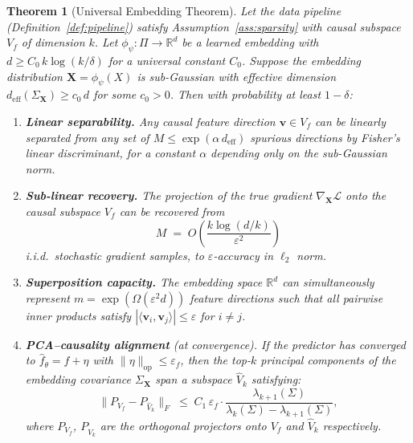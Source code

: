 \documentclass[11pt,a4paper]{article}
\theoremstyle{plain}
\newtheorem{theorem}{Theorem}[section]
\theoremstyle{definition}
\theoremstyle{remark}
\newcommand{\R}{\mathbb{R}}
\newcommand{\cL}{\mathcal{L}}
\newcommand{\deff}{d_{\mathrm{eff}}}
\newcommand{\ip}[2]{\langle #1, #2 \rangle}
\newcommand{\norm}[1]{\| #1 \|}
\begin{document}
\begin{theorem}[Universal Embedding Theorem]\label{thm:main}
Let the data pipeline (Definition~\ref{def:pipeline}) satisfy
Assumption~\ref{ass:sparsity} with causal subspace $V_f$ of dimension $k$.  Let
$\phi_\psi : \Pi \to \R^d$ be a learned embedding with $d \geq C_0\, k\log(k/\delta)$
for a universal constant $C_0$.  Suppose the embedding distribution
$\mathbf{X} = \phi_\psi(X)$ is sub-Gaussian with effective dimension
$\deff(\Sigma_{\mathbf{X}}) \geq c_0\,d$ for some $c_0 > 0$.  Then with
probability at least $1-\delta$:

\begin{enumerate}[label=\textup{(\roman*)},leftmargin=2.5em,itemsep=4pt]
  \item \textbf{Linear separability.}
    Any causal feature direction $\mathbf{v} \in V_f$ can be linearly separated
    from any set of $M \leq \exp(\alpha\,\deff)$ spurious directions by
    Fisher's linear discriminant, for a constant $\alpha$ depending only on the
    sub-Gaussian norm.

  \item \textbf{Sub-linear recovery.}
    The projection of the true gradient $\nabla_{\mathbf{X}}\cL$ onto the causal
    subspace $V_f$ can be recovered from
    \begin{equation}\label{eq:sublinear}
      M \;=\; O\!\left(\frac{k\log(d/k)}{\varepsilon^2}\right)
    \end{equation}
    i.i.d.\ stochastic gradient samples, to $\varepsilon$-accuracy in $\ell_2$
    norm.

  \item \textbf{Superposition capacity.}
    The embedding space $\R^d$ can simultaneously represent
    $m = \exp(\Omega(\varepsilon^2 d))$ feature directions such that all pairwise
    inner products satisfy $|\ip{\mathbf{v}_i}{\mathbf{v}_j}| \leq \varepsilon$
    for $i\neq j$.

  \item \textbf{PCA--causality alignment} (at convergence).
    If the predictor has converged to $\hat{f}_\theta = f + \eta$ with
    $\norm{\eta}_{\mathrm{op}} \leq \varepsilon_f$, then the top-$k$ principal
    components of the embedding covariance $\Sigma_\mathbf{X}$ span a subspace
    $\hat{V}_k$ satisfying:
    \begin{equation}\label{eq:alignment}
      \norm{P_{V_f} - P_{\hat{V}_k}}_F
      \;\leq\; C_1\,\varepsilon_f \cdot
      \frac{\lambda_{k+1}(\Sigma)}{\lambda_k(\Sigma) - \lambda_{k+1}(\Sigma)},
    \end{equation}
    where $P_{V_f}$, $P_{\hat{V}_k}$ are the orthogonal projectors onto $V_f$
    and $\hat{V}_k$ respectively.
\end{enumerate}
\end{theorem}
\end{document}
